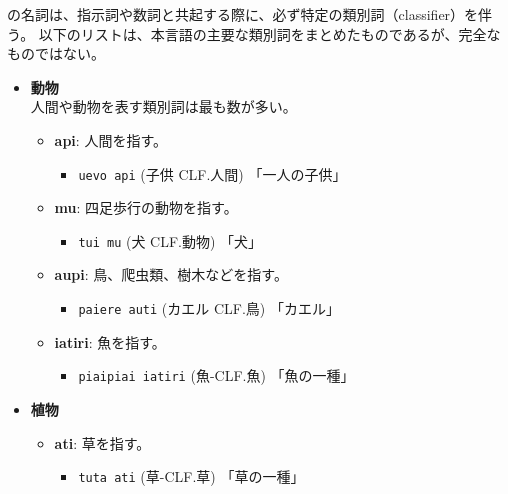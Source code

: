 \langname の名詞は、指示詞や数詞と共起する際に、必ず特定の類別詞（classifier）を伴う。
以下のリストは、本言語の主要な類別詞をまとめたものであるが、完全なものではない。

\begin{itemize}
    \item \textbf{動物}\\
    人間や動物を表す類別詞は最も数が多い。
        \begin{itemize}
            \item \textbf{api}: 人間を指す。
                \begin{itemize}
                    \item \texttt{uevo api} (子供 CLF.人間)
                    \quad 「一人の子供」
                \end{itemize}
            \item \textbf{mu}: 四足歩行の動物を指す。
                \begin{itemize}
                    \item \texttt{tui mu} (犬 CLF.動物)
                    \quad 「犬」
                \end{itemize}
            \item \textbf{aupi}: 鳥、爬虫類、樹木などを指す。
                \begin{itemize}
                    \item \texttt{paiere auti} (カエル CLF.鳥) 
                    \quad 「カエル」
                \end{itemize}
            \item \textbf{iatiri}: 魚を指す。
                \begin{itemize}
                    \item \texttt{piaipiai iatiri} (魚-CLF.魚)
                    \quad 「魚の一種」
                \end{itemize}
        \end{itemize}
    \item \textbf{植物}
        \begin{itemize}
            \item \textbf{ati}: 草を指す。
                \begin{itemize}
                    \item \texttt{tuta ati} (草-CLF.草) 
                    \quad 「草の一種」
                \end{itemize}

\end{itemize}
\end{itemize}
